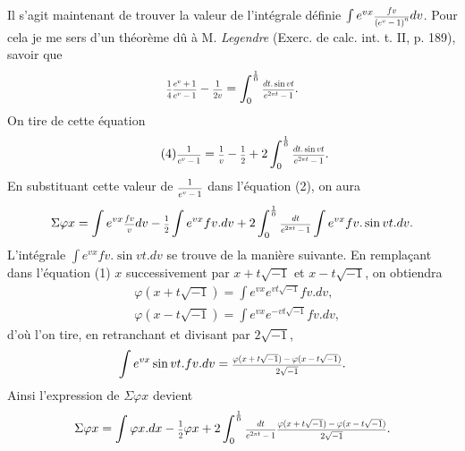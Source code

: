 \documentclass[oneside, 12 pt, leqno]{memoir}
\let\oldfrac\frac
\def\frac#1#2{\mathchoice{\text{\scalebox{.83}{${\oldfrac{#1}{#2}}$}}}{\text{\scalebox{.83}{${\displaystyle\oldfrac{#1}{#2}}$}}}{\genfrac{}{}{}{2}{#1}{#2}}{\genfrac{}{}{}{3}{#1}{#2}}}
\begin{document}
Il s'agit maintenant de trouver la valeur de l'intégrale définie \(\int e^{v x} \frac{f v}{\left(e^v-1\right)^n} d v\). Pour cela je me sers d'un théorème dû à M. \textit{Legendre} (Exerc. de calc. int. t. II, p. 189), savoir que
\[\frac{1}{4} \frac{e^v+1}{e^v-1}-\frac{1}{2 v}=\int_0^{\frac{1}{0}} \frac{d t. \sin v t}{e^{2 \pi t}-1}.\]
On tire de cette équation
\[\tag{4} \frac{1}{e^v-1}=\frac{1}{v}-\frac{1}{2}+2 \int_0^{\frac{1}{0}} \frac{d t. \sin v t}{e^{2 \pi t}-1}.\]
En substituant cette valeur de \(\frac{1}{e^v-1}\) dans l'équation (2), on aura
\[\Sigma \varphi x=\int e^{v x} \frac{f v}{v} d v-\frac{1}{2} \int e^{v x} f v. d v+2 \int_0^{\frac{1}{0}} \frac{d t}{e^{2 \pi t}-1} \int e^{v x} f v. \sin v t. d v.\]
L'intégrale \(\int e^{v x} f v. \sin v t. d v\) se trouve de la manière suivante. En remplaçant dans l'équation (1) \(x\) successivement par \(x+t \sqrt{-1}\) et \(x-t \sqrt{-1}\), on obtiendra
\[\begin{aligned}
& \varphi(x+t \sqrt{-1})=\int e^{v x} e^{v t \sqrt{-1}} f v. d v, \\
& \varphi(x-t \sqrt{-1})=\int e^{v x} e^{-v t \sqrt{-1}} f v. d v,
\end{aligned}\]
d'où l'on tire, en retranchant et divisant par \(2 \sqrt{-1}\),
\[\int e^{v x} \sin v t. f v. d v=\frac{\varphi(x+t \sqrt{-1})-\varphi(x-t \sqrt{-1})}{2 \sqrt{-1}}.\]
Ainsi l'expression de \(\Sigma \varphi x\) devient
\[\Sigma \varphi x=\int \varphi x. d x-\frac{1}{2} \varphi x+2 \int_0^{\frac{1}{0}} \frac{d t}{e^{2 \pi t}-1} \frac{\varphi(x+t \sqrt{-1})-\varphi(x-t \sqrt{-1})}{2 \sqrt{-1}}.\]
\end{document}
